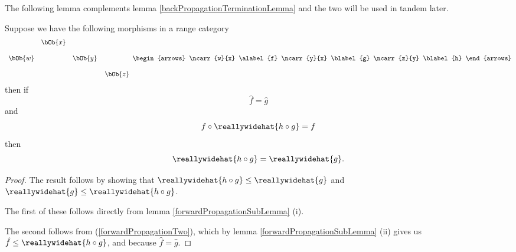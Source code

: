 The following lemma complements lemma \ref{backPropagationTerminationLemma} 
and the two will be used in tandem later.
\begin{lemma}
Suppose we have the following morphisms in a range category
\[
\begin{array} {c c c c c}
       &\bOb{x}                            \\[0.4cm]
\bOb{w}        &        &\bOb{y}           \\[0.4cm]
       &       &        &         &\kern-0.3cm\bOb{z} 
\end{array}
\begin{arrows}
\ncarr{w}{x} \alabel{f}
\ncarr{y}{x} \blabel{g}
\ncarr{z}{y} \blabel{h}
\end{arrows}
\]
then if 
\begin{equation}
\label{forwardPropagationTight}
\widehat{f}=\widehat{g}
\end{equation}
and 
\begin{equation}
\label{forwardPropagationTwo}
f \circ \reallywidehat{h \circ g}=f
\end{equation}
then 
\begin{equation}
\label{forwardPropagationThree}
\reallywidehat{h \circ g} = \reallywidehat{g}.
\end{equation}
\end{lemma}
\begin{proof}
The result follows by showing that
$\reallywidehat{h \circ g} \leq \reallywidehat{g}$
and
$\reallywidehat{g} \leq \reallywidehat{h \circ g}$.

The first of these 
follows directly from lemma \ref{forwardPropagationSubLemma} (i).

The second follows from (\ref{forwardPropagationTwo}), 
which by lemma \ref{forwardPropagationSubLemma} (ii)
gives us
$\hat{f} \leq \reallywidehat{h \circ g}$,
and because $\hat{f} = \hat{g}$.
\end{proof}

